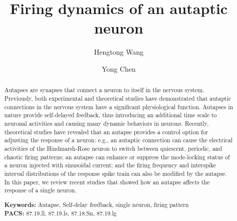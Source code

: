 \documentclass[twocolumn,showpacs,preprintnumbers,amsmath,amssymb,pre,superscriptaddress]{revtex4-1}
\begin{document}
\begin{CJK}{UTF8}{gbsn}



\title{Firing dynamics of an autaptic neuron}


\author{Hengtong Wang}

\author{Yong Chen}




\begin{abstract}
Autapses are synapses that connect a neuron to itself in the nervous system. Previously, both experimental and theoretical studies have demonstrated that autaptic connections in the nervous system have a significant physiological function. Autapses in nature provide self-delayed feedback, thus introducing an additional time scale to neuronal activities and causing many dynamic behaviors in neurons. Recently, theoretical studies have revealed that an autapse provides a control option for adjusting the response of a neuron: e.g., an autaptic connection can cause the electrical activities of the Hindmarsh-Rose neuron to switch between quiescent, periodic, and chaotic firing patterns; an autapse can enhance or suppress the mode-locking status of a neuron injected with sinusoidal current; and the firing frequency and interspike interval distributions of the response spike train can also be modified by the autapse. In this paper, we review recent studies that showed how an autapse affects the response of a single neuron.  

\bigskip
\textbf{Keywords:} Autapse, Self-delay feedback, single neuron, firing pattern\\

\textbf{PACS:} 87.19.ll, 87.19.ls, 87.18.Sn, 87.19.lg
\end{abstract}
\maketitle


\end{CJK}
\end{document}
